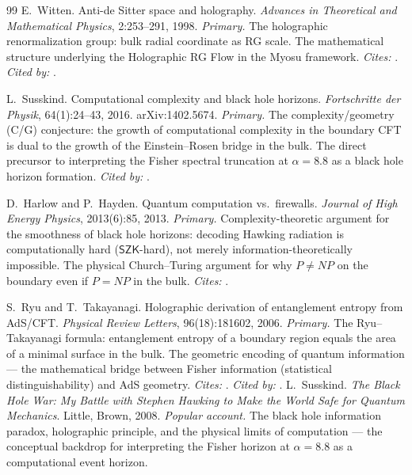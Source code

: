 \documentclass[12pt,a4paper]{article}
\begin{document}
\begin{thebibliography}{99}
E.~Witten.
\newblock Anti-de Sitter space and holography.
\newblock \emph{Advances in Theoretical and Mathematical Physics}, 2:253--291, 1998.
\newblock \textit{Primary.} The holographic renormalization group: bulk radial coordinate as
RG scale. The mathematical structure underlying the Holographic RG Flow in the Myosu
framework. \textit{Cites:} \cite{maldacena1999}. \textit{Cited by:} \cite{ahs1999}.

L.~Susskind.
\newblock Computational complexity and black hole horizons.
\newblock \emph{Fortschritte der Physik}, 64(1):24--43, 2016. arXiv:1402.5674.
\newblock \textit{Primary.} The complexity/geometry (C/G) conjecture: the growth of
computational complexity in the boundary CFT is dual to the growth of the
Einstein--Rosen bridge in the bulk. The direct precursor to interpreting the
Fisher spectral truncation at $\alpha=8.8$ as a black hole horizon formation.
\textit{Cited by:} \cite{aaronson2013}.

D.~Harlow and P.~Hayden.
\newblock Quantum computation vs.\ firewalls.
\newblock \emph{Journal of High Energy Physics}, 2013(6):85, 2013.
\newblock \textit{Primary.} Complexity-theoretic argument for the smoothness of black hole
horizons: decoding Hawking radiation is computationally hard ($\mathsf{SZK}$-hard),
not merely information-theoretically impossible. The physical Church--Turing
argument for why $P \neq NP$ on the boundary even if $P = NP$ in the bulk.
\textit{Cites:} \cite{aaronson2013}.

S.~Ryu and T.~Takayanagi.
\newblock Holographic derivation of entanglement entropy from AdS/CFT.
\newblock \emph{Physical Review Letters}, 96(18):181602, 2006.
\newblock \textit{Primary.} The Ryu--Takayanagi formula: entanglement entropy of a boundary
region equals the area of a minimal surface in the bulk. The geometric encoding
of quantum information --- the mathematical bridge between Fisher information
(statistical distinguishability) and AdS geometry. \textit{Cites:} \cite{maldacena1999}. \textit{Cited by:} \cite{ahs1999}.
L.~Susskind.
\newblock \emph{The Black Hole War: My Battle with Stephen Hawking to Make the World
Safe for Quantum Mechanics}.
\newblock Little, Brown, 2008.
\newblock \textit{Popular account.} The black hole information paradox, holographic principle,
and the physical limits of computation --- the conceptual backdrop for interpreting the
Fisher horizon at $\alpha=8.8$ as a computational event horizon.


\end{thebibliography}
\end{document}
